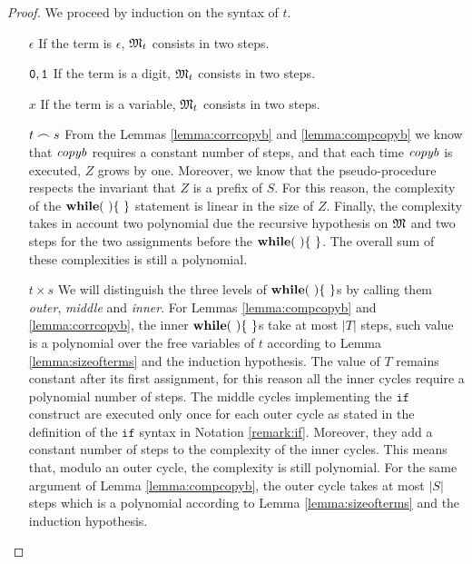 \begin{proof}
We proceed by induction on the syntax of $t$.
\begin{itemize}
\item[$\epsilon$] If the term is $\epsilon$, $\mathfrak M_t$ consists in two steps.
\item[$\mathtt{0},\mathtt{1}$] If the term is a digit, $\mathfrak M_t$ consists in two steps.
\item[$x$] If the term is a variable, $\mathfrak M_t$ consists in two steps.
\item[$t \frown s$] From the Lemmas \ref{lemma:corrcopyb} and \ref{lemma:compcopyb} we know that $\mathit{copyb}$ requires a constant number of steps, and that each time $\mathit{copyb}$ is executed, $Z$ grows by one. Moreover, we know that the pseudo-procedure respects the invariant that $Z$ is a prefix of $S$. For this reason, the complexity of the $\mathbf{while}(\ )\{\ \}$ statement is linear in the size of $Z$. Finally, the complexity takes in account two polynomial due the recursive hypothesis on $\mathfrak M$ and two steps for the two assignments before the $\mathbf{while}(\ )\{\ \}$. The overall sum of these complexities is still a polynomial.
\item[$t \times s$] We will distinguish the three levels of $\mathbf{while}(\ )\{\ \}$s by calling them \emph{outer}, \emph{middle} and \emph{inner}. For Lemmas \ref{lemma:compcopyb} and \ref{lemma:corrcopyb}, the inner $\mathbf{while}(\ )\{\ \}$s take at most $|T|$ steps, such value is a polynomial over the free variables of $t$ according to Lemma \ref{lemma:sizeofterms} and the induction hypothesis. The value of $T$ remains constant after its first assignment, for this reason all the inner cycles require a polynomial number of steps. The middle cycles implementing the $\mathtt{if}$ construct are executed only once for each outer cycle as stated in the definition of the $\mathtt{if}$ syntax in Notation \ref{remark:if}. Moreover, they add a constant number of steps to the complexity of the inner cycles. This means that, modulo an outer cycle, the complexity is still polynomial. For the same argument of Lemma \ref{lemma:compcopyb}, the outer cycle takes at most $|S|$ steps which is a polynomial according to Lemma \ref{lemma:sizeofterms} and the induction hypothesis.
\end{itemize}
\end{proof}


